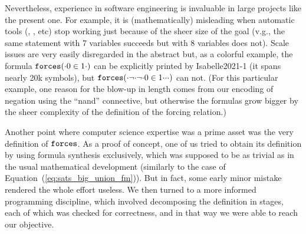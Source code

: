 Nevertheless, experience  in software engineering is invaluable in
large projects like the present one. For example, it is
(mathematically) misleading when automatic tools (,
, etc) stop working just because of the sheer size of the
goal (v.g., the same statement with 7 variables succeeds but with 8
variables does not). Scale issues are very easily disregarded in the
abstract but, as a colorful example, the formula $\mathop{\mathtt{forces}}({\cdot}0\in 1{\cdot})$
can be explicitly printed by Isabelle2021-1 (it spans nearly 20k symbols), but
$\mathop{\mathtt{forces}}({\cdot}\neg{\cdot}\neg{\cdot}0\in 1{\cdot}{\cdot}{\cdot})$
can not.
(For this particular example, one reason for the blow-up in
length comes from our encoding of negation using the “nand”
connective, but otherwise the formulas grow bigger by the sheer
complexity of the definition of the forcing relation.)

Another point where computer science expertise was a prime asset was
the very definition of $\mathop{\mathtt{forces}}$. As a
proof of concept, one of us tried to obtain its definition by
using formula synthesis exclusively, which was supposed to be as
trivial as in the usual
mathematical development (similarly to the case of
Equation~(\ref{eq:sats_big_union_fm})).
But in fact, some early minor mistake
rendered the whole effort useless. We then turned to a more
informed programming discipline, which involved decomposing the
definition in stages, each of which was checked for correctness, and
in that way we were able to reach our objective.


